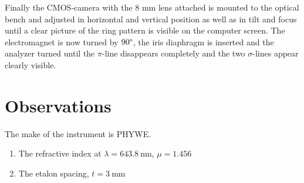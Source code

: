 \documentclass[%
 reprint,
nofootinbib,
 amsmath,amssymb,
 aps,
floatfix,
]{revtex4-2}
\begin{document}
    \par
    Finally the CMOS-camera with the 8 mm lens attached is mounted to the optical bench and adjusted in horizontal and vertical position as well as in tilt and focus until a clear picture of the ring pattern is visible on the computer screen. The electromagnet is now turned by $90 \degree$, the iris diaphragm is inserted and the analyzer turned until the $\pi$-line disappears completely and the two $\sigma$-lines appear clearly visible.

    

\section{Observations}
    The make of the instrument is PHYWE.
    \begin{enumerate}
        \item The refractive index at $\lambda = \SI{643.8}{\nano \metre}$, $\mu = 1.456$
        \item The etalon spacing, $t = \SI{3}{\milli \metre}$
    \end{enumerate}
\end{document}
